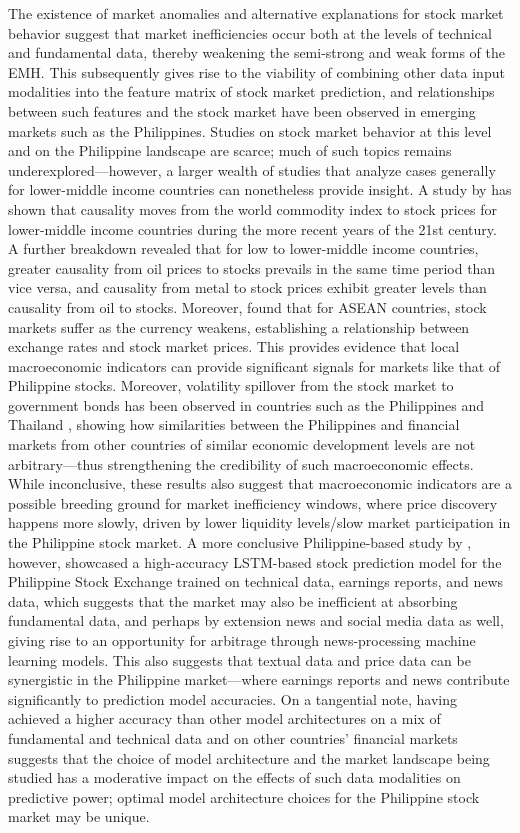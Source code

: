 \documentclass[stu,floatsintext]{apa7}
\begin{document}
The existence of market anomalies and alternative explanations for stock market behavior suggest that market inefficiencies occur both at the levels of technical and fundamental data, thereby weakening the semi-strong and weak forms of the EMH. This subsequently gives rise to the viability of combining other data input modalities into the feature matrix of stock market prediction, and relationships between such features and the stock market have been observed in emerging markets such as the Philippines. Studies on stock market behavior at this level and on the Philippine landscape are scarce; much of such topics remains underexplored—however, a larger wealth of studies that analyze cases generally for lower-middle income countries can nonetheless provide insight. A study by \parencite{enilov2021global} has shown that causality moves from the world commodity index to stock prices for lower-middle income countries during the more recent years of the 21st century. A further breakdown revealed that for low to lower-middle income countries, greater causality from oil prices to stocks prevails in the same time period than vice versa, and causality from metal to stock prices exhibit greater levels than causality from oil to stocks. Moreover, \parencite{aydin2024fx} found that for ASEAN countries, stock markets suffer as the currency weakens, establishing a relationship between exchange rates and stock market prices. This provides evidence that local macroeconomic indicators can provide significant signals for markets like that of Philippine stocks. Moreover, volatility spillover from the stock market to government bonds has been observed in countries such as the Philippines and Thailand \parencite{yurastika2021volatility}, showing how similarities between the Philippines and financial markets from other countries of similar economic development levels are not arbitrary—thus strengthening the credibility of such macroeconomic effects. While inconclusive, these results also suggest that macroeconomic indicators are a possible breeding ground for market inefficiency windows, where price discovery happens more slowly, driven by lower liquidity levels/slow market participation in the Philippine stock market. A more conclusive Philippine-based study by \textcite{sombrito2023philippine}, however, showcased a high-accuracy LSTM-based stock prediction model for the Philippine Stock Exchange trained on technical data, earnings reports, and news data, which suggests that the market may also be inefficient at absorbing fundamental data, and perhaps by extension news and social media data as well, giving rise to an opportunity for arbitrage through news-processing machine learning models. This also suggests that textual data and price data can be synergistic in the Philippine market—where earnings reports and news contribute significantly to prediction model accuracies. On a tangential note, having achieved a higher accuracy than other model architectures on a mix of fundamental and technical data and on other countries’ financial markets suggests that the choice of model architecture and the market landscape being studied has a moderative impact on the effects of such data modalities on predictive power; optimal model architecture choices for the Philippine stock market may be unique. 
\end{document}
